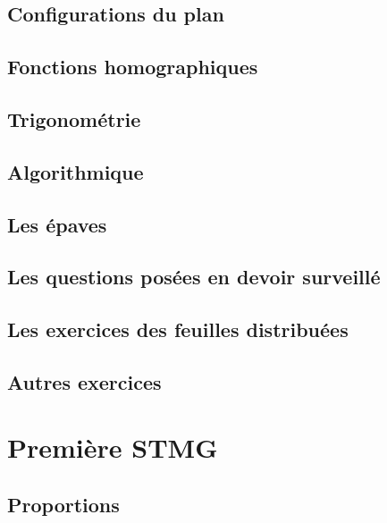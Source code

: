 \documentclass[a4paper,12pt]{book}
\begin{document}
\chapter{Configurations du plan}


\chapter{Fonctions homographiques}


\chapter{Trigonométrie}


\chapter{Algorithmique}


\chapter{Les épaves}


\chapter{Les questions posées en devoir surveillé}


\chapter{Les exercices des feuilles distribuées}


\chapter{Autres exercices}


\part{Première STMG}
\chapter{Proportions}

\end{document}
